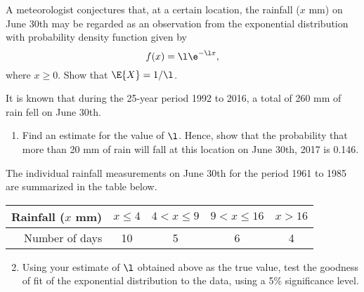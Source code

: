 \begin{problem}
    A meteorologist conjectures that, at a certain location, the rainfall ($x$ mm) on June 30th may be regarded as an observation from the exponential distribution with probability density function given by \[f(x) = \l \e^{-\l x},\] where $x \geq 0$. Show that $\E{X} = 1/\l$.

    It is known that during the 25-year period 1992 to 2016, a total of 260 mm of rain fell on June 30th.
    \begin{enumerate}
        \item Find an estimate for the value of $\l$. Hence, show that the probability that more than 20 mm of rain will fall at this location on June 30th, 2017 is 0.146.
    \end{enumerate}

    The individual rainfall measurements on June 30th for the period 1961 to 1985 are summarized in the table below. 

    \begin{table}[H]
        \centering
        \begin{tabular}{|r|c|c|c|c|}
        \hline
        Rainfall ($x$ mm) & $x \leq 4$ & $4 < x \leq 9$ & $9 < x \leq 16$ & $x > 16$ \\ \hline
        Number of days & 10 & 5 & 6 & 4 \\ \hline
        \end{tabular}
    \end{table}

    \begin{enumerate}
        \setcounter{enumi}{1}
        \item Using your estimate of $\l$ obtained above as the true value, test the goodness of fit of the exponential distribution to the data, using a 5\% significance level.
    \end{enumerate}
\end{problem}
